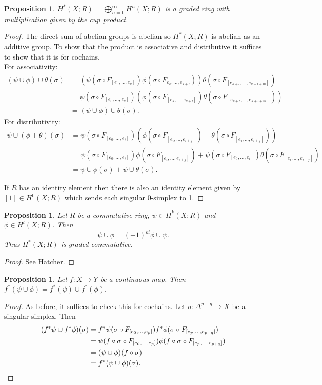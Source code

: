 \documentclass{article}
\newtheorem{proposition}[theorem]{Proposition}
\begin{document}
\begin{proposition}
$H^*(X;R)=\bigoplus_{n=0}^\infty H^n(X;R)$ is a graded ring with multiplication given by the cup product.
\end{proposition}
\begin{proof}
The direct sum of abelian groups is abelian so $H^*(X;R)$ is abelian as an additive group.
To show that the product is associative and distributive it suffices to show that it is for cochains.\\
For associativity:
\begin{align*}
(\psi\cup\phi)\cup\theta(\sigma)&=(\psi(\sigma\circ F_{[e_0,...,e_k]})\phi(\sigma\circ F_{e_k,...,e_{k+l}}))\theta(\sigma\circ F_{[e_{k+l},...,e_{k+l+m}]})\\&=\psi(\sigma\circ F_{[e_0,...,e_k]})(\phi(\sigma\circ F_{[e_k,...,e_{k+l}]})\theta(\sigma\circ F_{[e_{k+l},...,e_{k+l+m}]}))\\&=(\psi\cup\phi)\cup\theta(\sigma).
\end{align*}
For distributivity:
\begin{align*}
\psi\cup(\phi+\theta)(\sigma)&=\psi(\sigma\circ F_{[e_0,...,e_i]})(\phi(\sigma\circ F_{[e_i,...,e_{i+j}]})+\theta(\sigma\circ F_{[e_i,...,e_{i+j}]}))\\&=\psi(\sigma\circ F_{[e_0,...,e_i]})\phi(\sigma\circ F_{[e_i,...,e_{i+j}]})+\psi(\sigma\circ F_{[e_0,...,e_i]})\theta(\sigma\circ F_{[e_i,...,e_{i+j}]})\\&=\psi\cup\phi(\sigma)+\psi\cup\theta(\sigma).
\end{align*}


\noindent If $R$ has an identity element then there is also an identity element given by $[1]\in H^0(X;R)$ which sends each singular 0-simplex to 1.
\end{proof}

\begin{proposition}
Let $R$ be a commutative ring, $\psi\in H^k(X;R)$ and $\phi\in H^l(X;R)$. Then \[\psi\cup\phi=(-1)^{kl}\phi\cup\psi.\] Thus $H^*(X;R)$ is graded-commutative.
\end{proposition}
\begin{proof}
See Hatcher.
\end{proof}

\begin{proposition}
Let $f\colon X\to Y$ be a continuous map. Then $f^*(\psi\cup\phi)=f^*(\psi)\cup f^*(\phi)$.
\end{proposition}
\begin{proof}
As before, it suffices to check this for cochains. Let $\sigma\colon\Delta^{p+q}\to X$ be a singular simplex. Then 
\begin{align*}(f^*\psi\cup f^*\phi)(\sigma)&=f^*\psi(\sigma\circ F_{[e_0,...,e_p]})f^*\phi(\sigma\circ F_{[e_p,...,e_{p+q}]})\\&=\psi(f\circ\sigma\circ F_{[e_0,...,e_p]})\phi(f\circ\sigma\circ F_{[e_p,...,e_{p+q}]})\\&=(\psi\cup\phi)(f\circ\sigma)\\&=f^*(\psi\cup\phi)(\sigma).\qedhere
\end{align*}
\end{proof}
\end{document}
